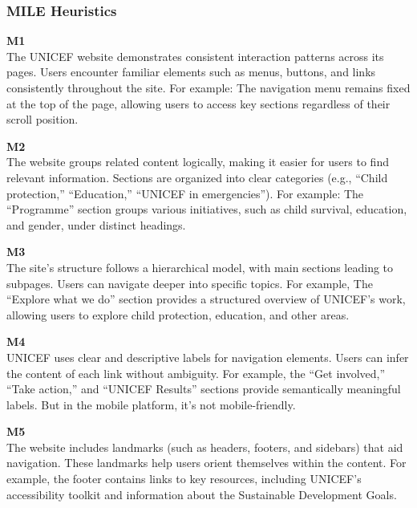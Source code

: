 \documentclass{article}
\begin{document}
\subsubsection{MILE Heuristics}
\begin{description}
    \item {\textbf{M1} \color{unicefGray}{Consistency of interaction}}\\
    The UNICEF website demonstrates consistent interaction patterns across its pages. Users encounter familiar elements such as menus, buttons, and links consistently throughout the site. For example: The navigation menu remains fixed at the top of the page, allowing users to access key sections regardless of their scroll position.
    \item {\textbf{M2} \color{unicefGray}{Group navigation}}\\
    The website groups related content logically, making it easier for users to find relevant information. Sections are organized into clear categories (e.g., “Child protection,” “Education,” “UNICEF in emergencies”). For example: The “Programme” section groups various initiatives, such as child survival, education, and gender, under distinct headings.
    \item {\textbf{M3} \color{unicefGray}{Structural navigation}}\\
    The site’s structure follows a hierarchical model, with main sections leading to subpages. Users can navigate deeper into specific topics. For example, The “Explore what we do” section provides a structured overview of UNICEF’s work, allowing users to explore child protection, education, and other areas.
    \item {\textbf{M4} \color{unicefGray}{Semantic navigation}}\\
    UNICEF uses clear and descriptive labels for navigation elements. Users can infer the content of each link without ambiguity. For example, the “Get involved,” “Take action,” and “UNICEF Results” sections provide semantically meaningful labels. But in the mobile platform, it's not mobile-friendly.
    \item {\textbf{M5} \color{unicefGray}{Presence of landmarks}}\\
    The website includes landmarks (such as headers, footers, and sidebars) that aid navigation. These landmarks help users orient themselves within the content. For example, the footer contains links to key resources, including UNICEF’s accessibility toolkit and information about the Sustainable Development Goals.
\end{description}
\end{document}
